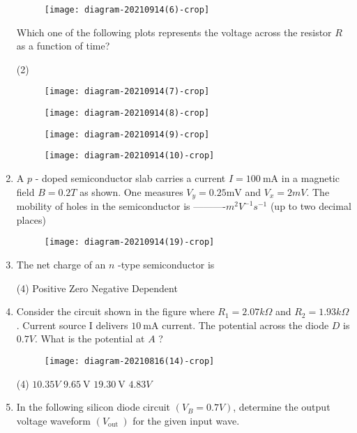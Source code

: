 \begin{enumerate}
	\begin{figure}[H]
		\centering
		\texttt{[image: diagram-20210914(6)-crop]}
	\end{figure}
	Which one of the following plots represents the voltage across the resistor $R$ as a function of time?
	{}
\begin{tasks}(2)
\task[\textbf{A.}] \begin{figure}[H]
	\centering
	\texttt{[image: diagram-20210914(7)-crop]}
\end{figure}
\task[\textbf{B.}] \begin{figure}[H]
	\centering
	\texttt{[image: diagram-20210914(8)-crop]}
\end{figure}
\task[\textbf{C.}] \begin{figure}[H]
	\centering
	\texttt{[image: diagram-20210914(9)-crop]}
\end{figure}
\task[\textbf{D.}] 
\begin{figure}[H]
	\centering
	\texttt{[image: diagram-20210914(10)-crop]}
\end{figure}
\end{tasks}
	\item A $p$ - doped semiconductor slab carries a current $I=100 \mathrm{~mA}$ in a magnetic field $B=0.2 T$ as shown. One measures $V_{y}=0.25 \mathrm{mV}$ and $V_{x}=2 m V .$ The mobility of holes in the semiconductor is ----------$m^{2} V^{-1} s^{-1}$ (up to two decimal places)
{	}
\begin{figure}[H]
\centering
\texttt{[image: diagram-20210914(19)-crop]}
\end{figure}
\item The net charge of an $n$ -type semiconductor is
{}

\begin{tasks}(4)
	\task[\textbf{A.}] Positive
	\task[\textbf{B.}] Zero
	\task[\textbf{C.}] Negative
	\task[\textbf{D.}] Dependent
\end{tasks}
	\item Consider the circuit shown in the figure where $R_{1}=2.07 k \Omega$ and $R_{2}=1.93 k \Omega$. Current source I delivers $10 \mathrm{~mA}$ current. The potential across the diode $D$ is $0.7 V$. What is the potential at $A$ ?
{}

\begin{figure}[H]
	\centering
	\texttt{[image: diagram-20210816(14)-crop]}
\end{figure}
\begin{tasks}(4)
	\task[\textbf{A.}] $10.35 V$
	\task[\textbf{B.}] $9.65 \mathrm{~V}$
	\task[\textbf{C.}] $19.30 \mathrm{~V}$
	\task[\textbf{D.}] $4.83 V$
\end{tasks}
\item In the following silicon diode circuit $\left(V_{B}=0.7 V\right)$, determine the output voltage waveform $\left(V_{\text {out }}\right)$ for the given input wave.
{}


\end{enumerate}
